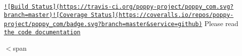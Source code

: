 \href{https://travis-ci.org/poppy-project/poppy_com}{\tt !\mbox{[}Build Status\mbox{]}(https\-://travis-\/ci.\-org/poppy-\/project/poppy\-\_\-com.\-svg?branch=master)}\href{https://coveralls.io/github/poppy-project/poppy_com?branch=master}{\tt !\mbox{[}Coverage Status\mbox{]}(https\-://coveralls.\-io/repos/poppy-\/project/poppy\-\_\-com/badge.\-svg?branch=master\&service=github)} Please read \href{http://poppy-project.github.io/poppy_com/}{\tt the code documentation}

$<$span 
